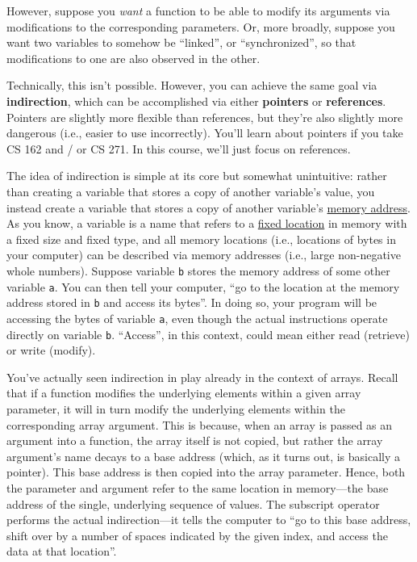 \documentclass{article}
\begin{document}
However, suppose you \textit{want} a function to be able to modify its arguments via modifications to the corresponding parameters. Or, more broadly, suppose you want two variables to somehow be ``linked'', or ``synchronized'', so that modifications to one are also observed in the other.

Technically, this isn't possible. However, you can achieve the same goal via \textbf{indirection}, which can be accomplished via either \textbf{pointers} or \textbf{references}. Pointers are slightly more flexible than references, but they're also slightly more dangerous (i.e., easier to use incorrectly). You'll learn about pointers if you take CS 162 and / or CS 271. In this course, we'll just focus on references.

The idea of indirection is simple at its core but somewhat unintuitive: rather than creating a variable that stores a copy of another variable's value, you instead create a variable that stores a copy of another variable's \ul{memory address}. As you know, a variable is a name that refers to a \ul{fixed location} in memory with a fixed size and fixed type, and all memory locations (i.e., locations of bytes in your computer) can be described via memory addresses (i.e., large non-negative whole numbers). Suppose variable \texttt{b} stores the memory address of some other variable \texttt{a}. You can then tell your computer, ``go to the location at the memory address stored in \texttt{b} and access its bytes''. In doing so, your program will be accessing the bytes of variable \texttt{a}, even though the actual instructions operate directly on variable \texttt{b}. ``Access'', in this context, could mean either read (retrieve) or write (modify).

You've actually seen indirection in play already in the context of arrays. Recall that if a function modifies the underlying elements within a given array parameter, it will in turn modify the underlying elements within the corresponding array argument. This is because, when an array is passed as an argument into a function, the array itself is not copied, but rather the array argument's name decays to a base address (which, as it turns out, is basically a pointer). This base address is then copied into the array parameter. Hence, both the parameter and argument refer to the same location in memory---the base address of the single, underlying sequence of values. The subscript operator performs the actual indirection---it tells the computer to ``go to this base address, shift over by a number of spaces indicated by the given index, and access the data at that location''.
\end{document}
